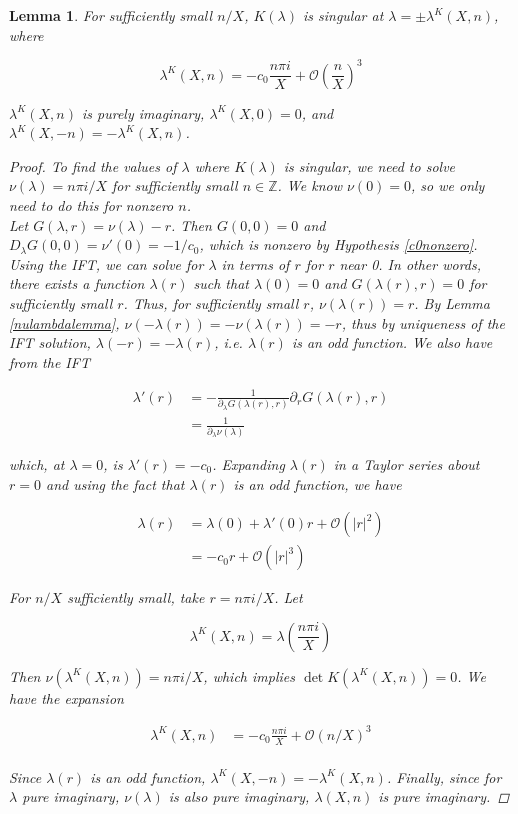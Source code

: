 \documentclass[12pt]{article}
\def\Z{{\mathbb Z}}
\newtheorem{lemma}{Lemma}
\begin{document}
\begin{lemma}\label{Ksingularlemma}
For sufficiently small $n/X$, $K(\lambda)$ is singular at $\lambda = \pm \lambda^K(X,n)$, where

\begin{equation}\label{lambdaK}
\lambda^K(X,n)
= -c_0 \frac{n \pi i }{X} + \mathcal{O}\left( \frac{n}{X} \right)^3
\end{equation} 

$\lambda^K(X,n)$ is purely imaginary, $\lambda^K(X, 0) = 0$, and $\lambda^K(X, -n) = -\lambda^K(X, n)$.

\begin{proof}
To find the values of $\lambda$ where $K(\lambda)$ is singular, we need to solve $\nu(\lambda) = n \pi i/X$ for sufficiently small $n \in \Z$. We know $\nu(0) = 0$, so we only need to do this for nonzero $n$. \\

Let $G(\lambda, r) = \nu(\lambda) - r$. Then $G(0, 0) = 0$ and $D_\lambda G(0, 0) = \nu'(0) = -1/c_0$, which is nonzero by Hypothesis \ref{c0nonzero}. Using the IFT, we can solve for $\lambda$ in terms of $r$ for $r$ near 0. In other words, there exists a function $\lambda(r)$ such that $\lambda(0) = 0$ and $G(\lambda(r), r) = 0$ for sufficiently small $r$. Thus, for sufficiently small $r$, $\nu(\lambda(r)) = r$. By Lemma \ref{nulambdalemma}, $\nu(-\lambda(r)) = -\nu(\lambda(r)) = -r$, thus by uniqueness of the IFT solution, $\lambda(-r) = -\lambda(r)$, i.e. $\lambda(r)$ is an odd function. We also have from the IFT 

\begin{align*}
\lambda'(r) &= -\frac{1}{\partial_\lambda G(\lambda(r), r) } \partial_r G(\lambda(r), r) \\
&= \frac{1}{\partial_\lambda \nu(\lambda) } 
\end{align*}

which, at $\lambda = 0$, is $\lambda'(r) = -c_0$. Expanding $\lambda(r)$ in a Taylor series about $r = 0$ and using the fact that $\lambda(r)$ is an odd function, we have

\begin{align*}
\lambda(r) &= \lambda(0) + \lambda'(0) r + \mathcal{O}(|r|^2) \\
&= -c_0 r + \mathcal{O}(|r|^3)
\end{align*}

For $n/X$ sufficiently small, take $r = n \pi i / X$. Let 

\[
\lambda^K(X, n) = \lambda\left( \frac{n \pi i}{X} \right)
\]

Then $\nu(\lambda^K(X, n)) = n \pi i / X$, which implies $\det K(\lambda^K(X, n)) = 0$. We have the expansion

\begin{align*}
\lambda^K(X,n)
&= -c_0 \frac{n \pi i }{X} + \mathcal{O}(n/X)^3 \\
\end{align*} 

Since $\lambda(r)$ is an odd function, $\lambda^K(X,-n) = -\lambda^K(X,n)$. Finally, since for $\lambda$ pure imaginary, $\nu(\lambda)$ is also pure imaginary, $\lambda(X,n)$ is pure imaginary.
\end{proof}
\end{lemma}
\end{document}
